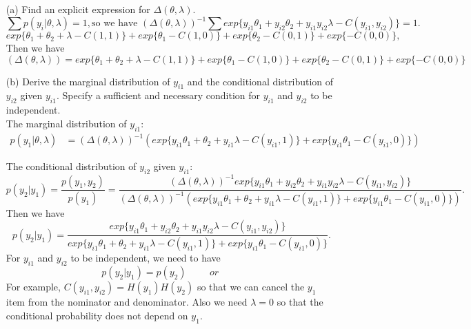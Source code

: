 \documentclass{homework}
\begin{document}
\begin{itemize}
    \item [(a)] Find an explicit expression for $\Delta(\theta, \lambda)$.
     \[
        \sum{p(y_i|\theta, \lambda)} = 1, \text{so we have }
        (\Delta(\theta, \lambda))^{-1} \sum{exp\{y_{i1}\theta_1 + y_{i2}\theta_2 + y_{i1}y_{i2}\lambda - C(y_{i1},y_{i2})\}} = 1.  
        \]
       \[  
        exp\{\theta_1 + \theta_2 + \lambda - C(1,1)\} + exp\{\theta_1 - C(1,0)\} + exp\{\theta_2 - C(0,1)\} + exp\{- C(0,0)\}, 
         \]
        Then we have
       \[  
        (\Delta(\theta, \lambda)) = exp\{\theta_1 + \theta_2 + \lambda - C(1,1)\} + exp\{\theta_1 - C(1,0)\} + exp\{\theta_2 - C(0,1)\} + exp\{- C(0,0)\}
    \]
     \item [(b)] Derive the marginal distribution of $y_{i1}$ and the conditional distribution of $y_{i2}$ given $y_{i1}$. Specify a sufficient and necessary condition for $y_{i1}$ and $y_{i2}$ to be independent. \\
     The marginal distribution of $y_{i1}$:
\begin{align*}
    p(y_1|\theta, \lambda) &= (\Delta(\theta, \lambda))^{-1} \left(exp\{y_{i1}\theta_1 + \theta_2 + y_{i1}\lambda - C(y_{i1},1)\} + exp\{y_{i1}\theta_1 - C(y_{i1},0)\} \right)
\end{align*}
         
     The conditional distribution of $y_{i2}$ given $y_{i1}$:
     \[
        p(y_2|y_1) = \frac{p(y_1,y_2)}{p(y_1)} = \frac{(\Delta(\theta, \lambda))^{-1} exp\{y_{i1}\theta_1 + y_{i2}\theta_2 + y_{i1}y_{i2}\lambda - C(y_{i1},y_{i2})\}}{(\Delta(\theta, \lambda))^{-1} (exp\{y_{i1}\theta_1 + \theta_2 + y_{i1}\lambda - C(y_{i1},1)\} + exp\{y_{i1}\theta_1 - C(y_{i1},0)\})}.  
        \]
        Then we have
        \[
        p(y_2|y_1) =  \frac{ exp\{y_{i1}\theta_1 + y_{i2}\theta_2 + y_{i1}y_{i2}\lambda - C(y_{i1},y_{i2})\}}{exp\{y_{i1}\theta_1 + \theta_2 + y_{i1}\lambda - C(y_{i1},1)\} + exp\{y_{i1}\theta_1 - C(y_{i1},0)\}}.  
        \]
        For $y_{i1}$ and $y_{i2}$ to be independent, we need to have\\
        \[
        p(y_2|y_1) = p(y_2) \hspace{1cm} or  \hspace{1cm} 
        \]
For example, $C(y_{i1},y_{i2}) = H(y_1)H(y_2)$ so that we can cancel the $y_1$ item from the nominator and denominator. Also we need $\lambda = 0$ so that the conditional probability does not depend on $y_1$.\\
        

\end{itemize}
\end{document}
